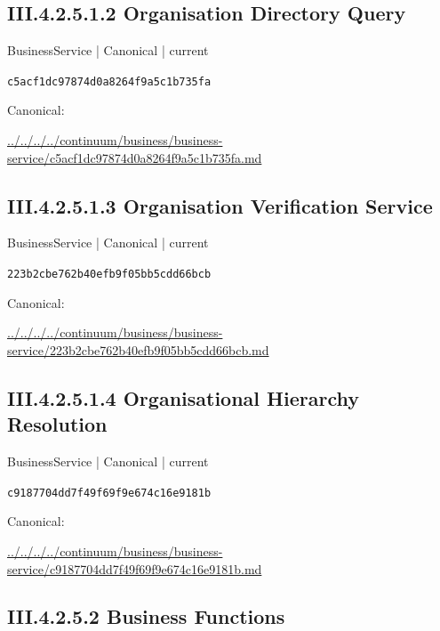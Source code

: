\documentclass[10pt,a4paper]{article}
\begin{document}
\subsection*{III.4.2.5.1.2 Organisation Directory Query}
\label{element-c5acf1dc97874d0a8264f9a5c1b735fa}
{\small BusinessService | Canonical | current}\par
\texttt{c5acf1dc97874d0a8264f9a5c1b735fa}\par
Canonical: \par
{\footnotesize\url{../../../../continuum/business/business-service/c5acf1dc97874d0a8264f9a5c1b735fa.md}}\par
\subsection*{III.4.2.5.1.3 Organisation Verification Service}
\label{element-223b2cbe762b40efb9f05bb5cdd66bcb}
{\small BusinessService | Canonical | current}\par
\texttt{223b2cbe762b40efb9f05bb5cdd66bcb}\par
Canonical: \par
{\footnotesize\url{../../../../continuum/business/business-service/223b2cbe762b40efb9f05bb5cdd66bcb.md}}\par
\subsection*{III.4.2.5.1.4 Organisational Hierarchy Resolution}
\label{element-c9187704dd7f49f69f9e674c16e9181b}
{\small BusinessService | Canonical | current}\par
\texttt{c9187704dd7f49f69f9e674c16e9181b}\par
Canonical: \par
{\footnotesize\url{../../../../continuum/business/business-service/c9187704dd7f49f69f9e674c16e9181b.md}}\par
\subsection*{III.4.2.5.2 Business Functions}
\end{document}

